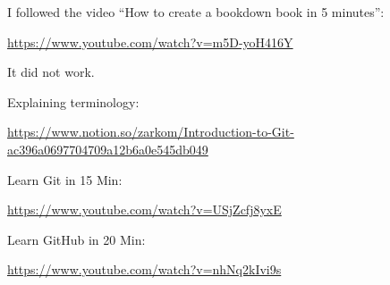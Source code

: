 \documentclass[
]{book}
\begin{document}
I followed the video ``How to create a bookdown book in 5 minutes'':

\url{https://www.youtube.com/watch?v=m5D-yoH416Y}

It did not work.

Explaining terminology:

\url{https://www.notion.so/zarkom/Introduction-to-Git-ac396a0697704709a12b6a0e545db049}

Learn Git in 15 Min:

\url{https://www.youtube.com/watch?v=USjZcfj8yxE}

Learn GitHub in 20 Min:

\url{https://www.youtube.com/watch?v=nhNq2kIvi9s}

  
\end{document}
